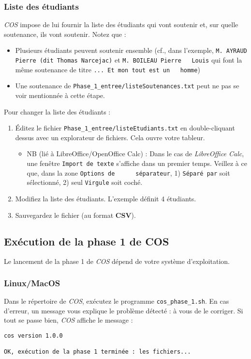\documentclass[11pt]{article}
\begin{document}
\subsubsection{Liste des étudiants}
\label{sec-4-1-5}
\emph{COS} impose de lui fournir la liste des étudiants qui vont soutenir
et, sur quelle soutenance, ils vont soutenir. Notez que :
\begin{itemize}
\item Plusieurs étudiants peuvent soutenir ensemble (cf., dans l'exemple,
\verb~M. AYRAUD Pierre (dit Thomas Narcejac)~ et \verb~M. BOILEAU Pierre   Louis~ qui font la même soutenance de titre \verb~... Et mon tout est un   homme~)
\item Une soutenance de \verb~Phase_1_entree/listeSoutenances.txt~ peut ne pas
se voir mentionnée à cette étape.
\end{itemize}

Pour changer la liste des étudiants :
\begin{enumerate}
\item Éditez le fichier \verb~Phase_1_entree/listeEtudiants.txt~ en
double-cliquant dessus avec un explorateur de fichiers. Cela ouvre
votre tableur.
\begin{itemize}
\item NB (lié à LibreOffice/OpenOffice Calc) : Dans le cas de
\emph{LibreOffice Calc}, une fenêtre \verb~Import de texte~ s'affiche dans
un premier temps. Veillez à ce que, dans la zone \verb~Options de      séparateur~, 1) \verb~Séparé par~ soit sélectionné, 2) seul \verb~Virgule~
soit coché.
\end{itemize}
\item Modifiez la liste des étudiants. L'exemple définit 4 étudiants.
\item Sauvegardez le fichier (au format \textbf{CSV}).
\end{enumerate}
\subsection{Exécution de la phase 1 de COS}
\label{sec-4-2}
Le lancement de la phase 1 de \emph{COS} dépend de votre système
d'exploitation.
\subsubsection{Linux/MacOS}
\label{sec-4-2-1}
Dans le répertoire de \emph{COS}, exécutez le programme
\verb~cos_phase_1.sh~. En cas d'erreur, un message vous explique le
problème détecté : à vous de le corriger. Si tout se passe bien, \emph{COS}
affiche le message :
\begin{verbatim}
cos version 1.0.0

OK, exécution de la phase 1 terminée : les fichiers...
\end{verbatim}
\end{document}
